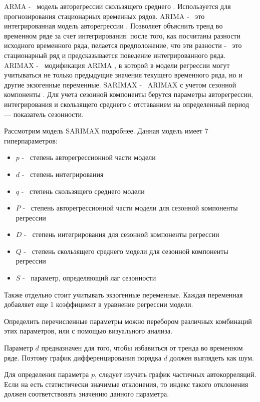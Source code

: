 ARMA -~ модель авторегрессии скользящего среднего \cite{torres2005forecast}. Используется для прогнозирования
стационарных временных рядов.
ARIMA -~ это интегрированная модель авторегрессии \cite{contreras2003arima}. Позволяет объяснить тренд во временном
ряде за счет интегрирования: после того, как посчитаны разности исходного временного ряда,
пелается предположение, что эти разности -~ это стационарный ряд и предсказывается поведение
интегрированного ряда.
ARIMAX -~ модификация ARIMA \cite{peter2012arima}, в которой в модели регрессии могут учитываться не только предыдущие значения
текущего временного ряда, но и другие экзогенные переменные.
SARIMAX -~ ARIMAX с учетом сезонной компоненты \cite{omenzetter2005seasonal}. Для учета сезонной компоненты
берутся параметры авторегрессии, интегрирования и скользящего среднего с отставанием
на определенный период --- показатель сезонности.

Рассмотрим модель SARIMAX подробнее. Данная модель имеет 7 гиперпараметров:
\begin{itemize}
	\item $ p $ -~ степень авторегрессионной части модели
	\item $ d $ -~ степень интегрирования
	\item $ q $ -~ степень скользящего среднего модели
	\item $ P $ -~ степень авторегрессионной части модели для сезонной компоненты регрессии
	\item $ D $ -~ степень интегрирования для сезонной компоненты регрессии
	\item $ Q $ -~ степень скользящего среднего модели для сезонной компоненты регрессии
	\item $ S $ -~ параметр, определяющий лаг сезонности
\end{itemize}

Также отдельно стоит учитывать экзогенные переменные. Каждая переменная добавляет еще 1 коэффициент
в уравнение регрессии модели.

Определить перечисленные параметры можно перебором различных комбинаций этих параметров,
или с помощью визуального анализа.

Параметр $ d $ предназначен для того, чтобы избавиться от тренда во временном
ряде. Поэтому график дифференцирования порядка $ d $ должен выглядеть как шум.

Для определения параметра $ p $, следует изучать график частичных автокорреляций.
Если на есть статистически значимые отклонения, то индекс такого отклонения должен соответствовать
значению данного параметра.

